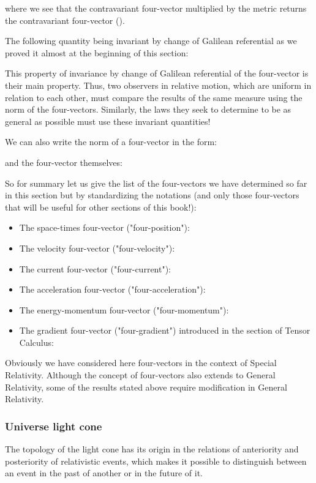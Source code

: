 	where we see that the contravariant four-vector multiplied by the metric returns the contravariant four-vector ().

	The following quantity being invariant by change of Galilean referential as we proved it almost at the beginning of this section:
	
	This property of invariance by change of Galilean referential of the four-vector is their main property. Thus, two observers in relative motion, which are uniform in relation to each other, must compare the results of the same measure using the norm of the four-vectors. Similarly, the laws they seek to determine to be as general as possible must use these invariant quantities! 
	
	We can also write the norm of a four-vector in the form:
	
	and the four-vector themselves:
	
	So for summary let us give the list of the four-vectors we have determined so far in this section but by standardizing the notations (and only those four-vectors that will be useful for other sections of this book!):
	\begin{itemize}
		\item The space-times four-vector ("four-position"):
		

		\item The velocity four-vector ("four-velocity"):
		
		
		\item The current four-vector ("four-current"):
		
		
		\item The acceleration four-vector ("four-acceleration"):
		
		
		\item The energy-momentum four-vector ("four-momentum"):
		

		\item The gradient four-vector ("four-gradient") introduced in the section of Tensor Calculus:
		
	\end{itemize}
	Obviously we have considered here four-vectors in the context of Special Relativity. Although the concept of four-vectors also extends to General Relativity, some of the results stated above require modification in General Relativity.
	
	\subsubsection{Universe light cone}
	The topology of the light cone has its origin in the relations of anteriority and posteriority of relativistic events, which makes it possible to distinguish between an event in the past of another or in the future of it.

